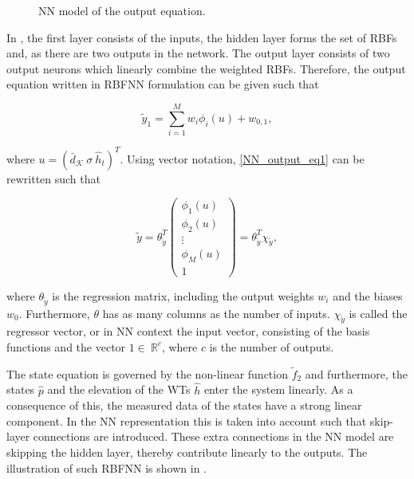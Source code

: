  \begin{figure}[H]
 \centering
  
  \vspace{-7mm}
 \caption{NN model of the output equation.}
 \label{fig:nn_output}
 \end{figure}

 \vspace{-3mm}

 In , the first layer consists of the inputs, the hidden layer forms the set of RBFs and, as there are two outputs in the network. The output layer consists of two output neurons which linearly combine the weighted RBFs. Therefore, the output equation written in RBFNN formulation can be given such that 

  \begin{equation}
\label{NN_output_eq1}
\tilde{y}_1 = \sum_{i = 1}^M w_i \phi_i(u) +  w_{0,1},
\end{equation}

where $u = (\bar{d}_{\mathcal{K}} \ \sigma \ \hat{h}_t )^T$. Using vector notation, \eqref{NN_output_eq1} can be rewritten such that

  \begin{equation}
\label{NN_output_vector1}
\tilde{y} = \theta^T_{\tilde{y}} 
          \begin{pmatrix}
           \phi_1(u) \\[1pt]
           \phi_2(u) \\[1pt]
           \vdots \\[1pt]
           \phi_M(u)\\[3pt]
           1 
         \end{pmatrix}
         =
         \theta^T_{\tilde{y}} \chi_{\tilde{y}},
\end{equation}

where $\theta_{\tilde{y}}$ is the regression matrix, including the output weights $w_i$ and the biases $w_0$. Furthermore, $\theta$ has as many columns as the number of inputs. $\chi_{\tilde{y}}$ is called the regressor vector, or in NN context the input vector, consisting of the basis functions and the vector $1 \in \: \mathbb{R}^{c} $, where $c$ is the number of outputs. 

The state equation is governed by the non-linear function $\tilde{f}_2$ and furthermore, the states $\hat{p}$ and the elevation of the WTs $\hat{h}$ enter the system linearly. As a consequence of this, the measured data of the states have a strong linear component. In the NN representation this is taken into account such that skip-layer connections are introduced. These extra connections in the NN model are skipping the hidden layer, thereby contribute linearly to the outputs. The illustration of such RBFNN is shown in .

